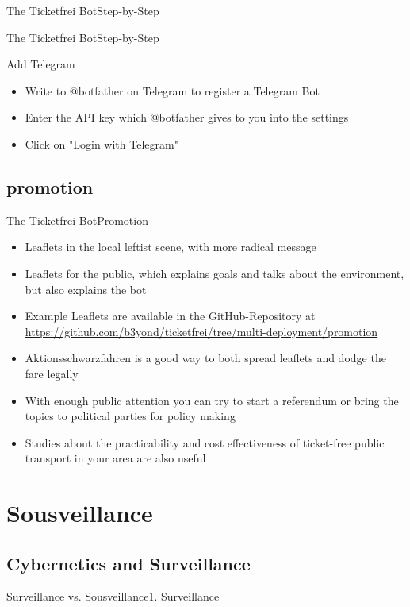 \documentclass[10pt]{beamer}
\begin{document}
{\begin{frame}{The Ticketfrei Bot}{Step-by-Step}
\end{frame}
\begin{frame}{The Ticketfrei Bot}{Step-by-Step}

\begin{block}{{Add Telegram}}
  \begin{itemize}
    \item Write to @botfather on Telegram to register a Telegram Bot
    \item Enter the API key which @botfather gives to you into the settings
    \item Click on "Login with Telegram"
  \end{itemize}
\end{block}

\end{frame}

\subsection{promotion}
\begin{frame}{The Ticketfrei Bot}{Promotion}

\begin{itemize}
  \item Leaflets in the local leftist scene, with more radical message
  \item Leaflets for the public, which explains goals and talks about the environment, but also explains the bot
  \item Example Leaflets are available in the GitHub-Repository at \url{https://github.com/b3yond/ticketfrei/tree/multi-deployment/promotion}
  \item<2-> Aktionsschwarzfahren is a good way to both spread leaflets and dodge the fare legally
  \item<3-> With enough public attention you can try to start a referendum or bring the topics to political parties for policy making
  \item<4-> Studies about the practicability and cost effectiveness of ticket-free public transport in your area are also useful
\end{itemize}

\end{frame}

\section{Sousveillance}
\subsection{Cybernetics and Surveillance}
\begin{frame}{Surveillance vs. Sousveillance}{1. Surveillance}


\end{frame}}
\end{document}
